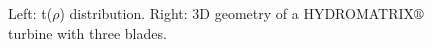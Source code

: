\begin{figure}[h!]
\begin{minipage}[b]{0.5\linewidth}
 \centering
\end{minipage}
\begin{minipage}[b]{0.5\linewidth}
 \centering
\end{minipage}
\caption{Left: t($\rho$) distribution. Right: 3D geometry of a HYDROMATRIX$\circledR$ turbine with three blades.}
\label{param10}
\end{figure}

